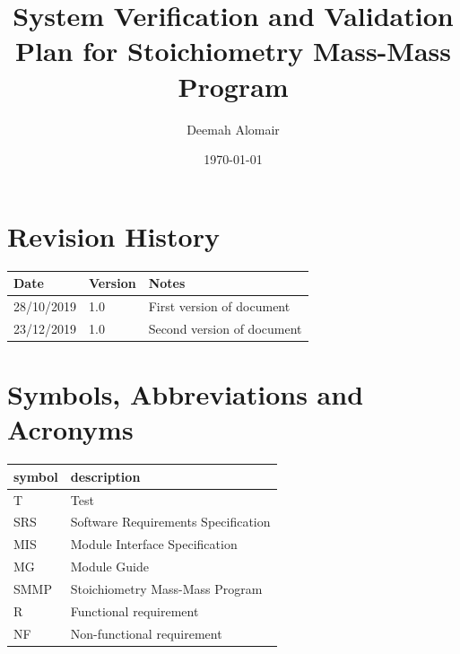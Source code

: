 \documentclass[12pt, titlepage]{article}
\begin{document}
\title{System Verification and Validation Plan for Stoichiometry Mass-Mass Program } 
\author{Deemah Alomair}
\date{\today}
	
\maketitle


\section{Revision History}

\begin{tabularx}{\textwidth}{p{3cm}p{2cm}X}
\toprule {\bf Date} & {\bf Version} & {\bf Notes}\\
\midrule
28/10/2019 & 1.0 & First version of document\\
23/12/2019 & 1.0 & Second version of document\\
\bottomrule
\end{tabularx}

\newpage

\tableofcontents

\listoftables 

\listoffigures


\newpage

\section{Symbols, Abbreviations and Acronyms}

\renewcommand{\arraystretch}{1.2}
\begin{tabular}{l l} 
  \toprule		
  \textbf{symbol} & \textbf{description}\\
  \midrule 
   T & Test\\
  SRS & Software Requirements Specification\\
  MIS & Module Interface Specification\\
  MG & Module Guide\\
  SMMP & Stoichiometry Mass-Mass Program \\
  R & Functional requirement\\
  NF & Non-functional requirement\\
  \bottomrule
\end{tabular}\\

\newpage

\end{document}
